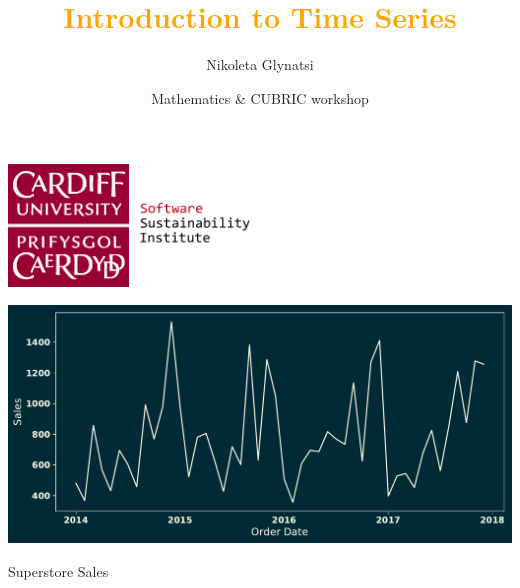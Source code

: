 \documentclass{beamer}
\title{\textcolor{orange}{Introduction to Time Series}}
\author{Nikoleta Glynatsi}
\date{Mathematics \& CUBRIC workshop}
\begin{document}
\maketitle

\begin{frame}
    \begin{center}
    \includegraphics[width=0.24\textwidth]{static/cardiff_uni_logo.jpg}\hspace{10pt}
    \includegraphics[width=0.24\textwidth]{static/ssi-logo.png}
    \end{center}
\end{frame}

\begin{frame}
    \begin{center}
    \includegraphics[width=\textwidth]{static/sales.pdf}\vspace{1cm}

    Superstore Sales
    \end{center}
\end{frame}

\begin{frame}
    \begin{center}
        
    \end{center}
\end{frame}
\end{document}
